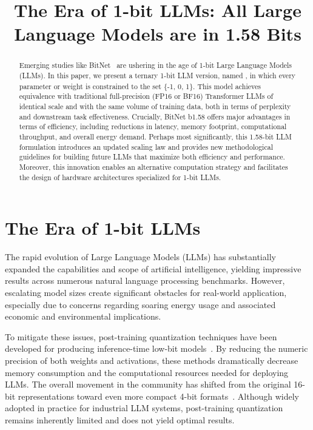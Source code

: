 \title{The Era of 1-bit LLMs: All Large Language Models are in 1.58 Bits}

\begin{abstract}
Emerging studies like BitNet~\cite{bitnet} are ushering in the age of 1-bit Large Language Models (LLMs). In this paper, we present a ternary 1-bit LLM version, named \textbf{}, in which every parameter or weight is constrained to the set \{-1, 0, 1\}. This model achieves equivalence with traditional full-precision (FP16 or BF16) Transformer LLMs of identical scale and with the same volume of training data, both in terms of perplexity and downstream task effectiveness. Crucially, BitNet b1.58 offers major advantages in terms of efficiency, including reductions in latency, memory footprint, computational throughput, and overall energy demand. Perhaps most significantly, this 1.58-bit LLM formulation introduces an updated scaling law and provides new methodological guidelines for building future LLMs that maximize both efficiency and performance. Moreover, this innovation enables an alternative computation strategy and facilitates the design of hardware architectures specialized for 1-bit LLMs.
\end{abstract}

\section{The Era of 1-bit LLMs}

The rapid evolution of Large Language Models (LLMs) has substantially expanded the capabilities and scope of artificial intelligence, yielding impressive results across numerous natural language processing benchmarks. However, escalating model sizes create significant obstacles for real-world application, especially due to concerns regarding soaring energy usage and associated economic and environmental implications.

To mitigate these issues, post-training quantization techniques have been developed for producing inference-time low-bit models~\cite{smoothquant, gptq, quip, quip_sharp}. By reducing the numeric precision of both weights and activations, these methods dramatically decrease memory consumption and the computational resources needed for deploying LLMs. The overall movement in the community has shifted from the original 16-bit representations toward even more compact 4-bit formats~\cite{gptq, awq}. Although widely adopted in practice for industrial LLM systems, post-training quantization remains inherently limited and does not yield optimal results.

